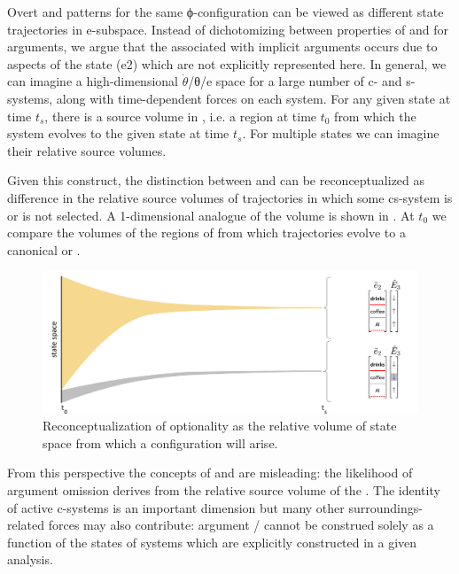   Overt and  patterns for the same ϕ-con\-fig\-u\-ra\-tion can be viewed as different state trajectories in e-subspace. Instead of dichotomizing between properties of  and  for arguments, we argue that the  associated with implicit arguments occurs due to aspects of the state (e2) which are not explicitly represented here. In general, we can imagine a high-di\-men\-sional $\dot{\theta}$/θ/e space for a large number of c- and s-systems, along with time-dependent  forces on each system. For any given state at time $t_s$, there is a source volume in , i.e. a  region at time $t_0$ from which the system evolves to the given state at time $t_s$. For multiple states we can imagine their relative source volumes. 

  Given this construct, the distinction between  and  can be reconceptualized as difference in the relative source volumes of trajectories in which some cs-system is or is not selected. A 1-di\-men\-sional analogue of the  volume is shown in {}. At $t_0$ we compare the volumes of the regions of  from which trajectories evolve to a canonical or .

  
\begin{figure}
\includegraphics[width=\textwidth]{figures/Tilsen-img88.png}
\caption{Reconceptualization of optionality as the relative volume of state space from which a configuration will arise.}
\label{fig:4:38}
\end{figure}
 

  From this perspective the concepts of  and  are misleading: the likelihood of argument omission derives from the relative source volume of the . The identity of active c-systems is an important dimension but many other surroundings-related forces may also contribute: argument / cannot be construed solely as a function of the states of systems which are explicitly constructed in a given analysis.

